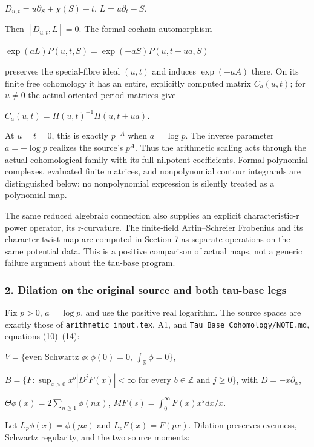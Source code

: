 \documentclass{article}
\begin{document}
\(D_{u,t}=u \partial_S+\chi(S)-t\), \(L=u \partial_t-S\).

Then \([D_{u,t},L]=0\). The formal cochain automorphism

\textbf{\(\exp(a L)P(u,t,S)=\exp(-aS) P(u,t+ua,S)\)}

preserves the special-fibre ideal \((u,t)\) and induces \(\exp(-aA)\) there. On its finite free cohomology it has an entire, explicitly computed matrix \(C_a(u,t)\); for \(u\ne 0\) the actual oriented period matrices give

\textbf{\(C_a(u,t)=\Pi(u,t)^{-1}\Pi(u,t+ua)\).}

At \(u=t=0\), this is exactly \(p^{-A}\) when \(a=\log p\). The inverse parameter \(a=-\log p\) realizes the source's \(p^A\). Thus the arithmetic scaling acts through the actual cohomological family with its full nilpotent coefficients. Formal polynomial complexes, evaluated finite matrices, and nonpolynomial contour integrands are distinguished below; no nonpolynomial expression is silently treated as a polynomial map.

The same reduced algebraic connection also supplies an explicit characteristic-r power operator, its r-curvature. The finite-field Artin--Schreier Frobenius and its character-twist map are computed in Section 7 as separate operations on the same potential data. This is a positive comparison of actual maps, not a generic failure argument about the tau-base program.

\subsubsection{2. Dilation on the original source and both tau-base legs}\label{endpoint-f1_scaling--dilation-on-the-original-source-and-both-tau-base-legs}

Fix \(p>0\), \(a=\log p\), and use the positive real logarithm. The source spaces are exactly those of \nolinkurl{arithmetic_input.tex}, A1, and \nolinkurl{Tau_Base_Cohomology/NOTE.md}, equations (10)--(14):

\(V=\{\text{even Schwartz }\phi:\phi(0)=0,\ \int_{\mathbb R}\phi=0\}\),

\(B=\{F:\sup_{x>0}x^b|D^jF(x)|<\infty\text{ for every }b\in\mathbb Z\text{ and }j\ge 0\}\), with \(D=-x \partial_x\),

\(\Theta \phi(x)=2 \sum_{n\ge 1}\phi(nx)\), \(MF(s)=\int_0^\infty F(x)x^s dx/x\).

Let \(L_p \phi(x)=\phi(px)\) and \(L_p F(x)=F(px)\). Dilation preserves evenness, Schwartz regularity, and the two source moments:
\end{document}
